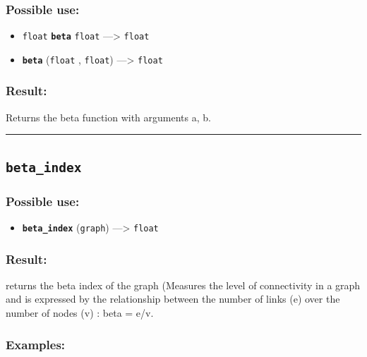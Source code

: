 \documentclass[]{book}
\providecommand{\tightlist}{%
  \setlength{\itemsep}{0pt}\setlength{\parskip}{0pt}}
\theoremstyle{definition}
\theoremstyle{definition}
\theoremstyle{definition}
\theoremstyle{remark}
\begin{document}
\subsubsection{Possible use:}\label{possible-use-65}

\begin{itemize}
\tightlist
\item
  \texttt{float} \textbf{\texttt{beta}} \texttt{float} ---\textgreater{}
  \texttt{float}
\item
  \textbf{\texttt{beta}} (\texttt{float} , \texttt{float})
  ---\textgreater{} \texttt{float}
\end{itemize}

\subsubsection{Result:}\label{result-64}

Returns the beta function with arguments a, b.

\begin{center}\rule{0.5\linewidth}{\linethickness}\end{center}

\subsection{\texorpdfstring{\texttt{beta\_index}}{beta\_index}}\label{beta_index}

\subsubsection{Possible use:}\label{possible-use-66}

\begin{itemize}
\tightlist
\item
  \textbf{\texttt{beta\_index}} (\texttt{graph}) ---\textgreater{}
  \texttt{float}
\end{itemize}

\subsubsection{Result:}\label{result-65}

returns the beta index of the graph (Measures the level of connectivity
in a graph and is expressed by the relationship between the number of
links (e) over the number of nodes (v) : beta = e/v.

\subsubsection{Examples:}\label{examples-52}
\end{document}
